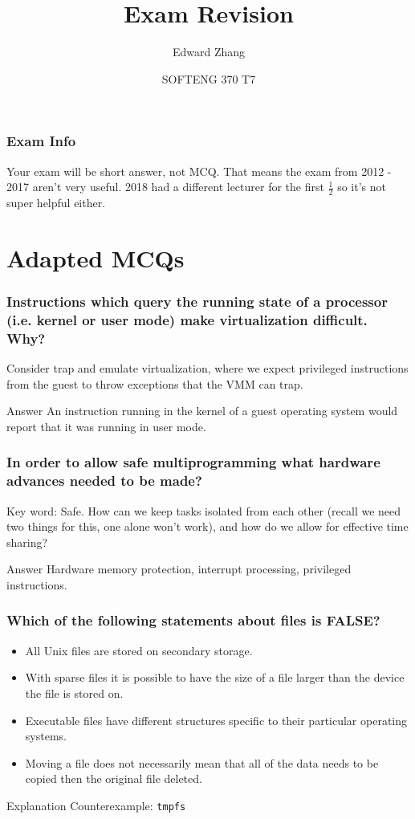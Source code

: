 \documentclass{beamer}
\title[SOFTENG 370 Tutorial 7 (2019)] %
{Exam Revision}
\author{Edward Zhang}
\date[October 2019] %
{SOFTENG 370 T7}
\begin{document}
\frame{\titlepage}
\begin{frame}
  \frametitle{Exam Info}
  Your exam will be short answer, not MCQ. That means the exam from 2012 - 2017 aren't very useful. 2018 had a different lecturer for the first $\frac{1}{2}$ so it's not super helpful either.\\
\end{frame}
\section{Adapted MCQs}
\begin{frame}
  \frametitle{Instructions which query the running state of a processor (i.e. kernel or user mode) make virtualization difficult. Why?}
  \pause
  Consider trap and emulate virtualization, where we expect privileged instructions from the guest to throw exceptions that the VMM can trap.
  \pause
  \begin{block}{Answer}
    An instruction running in the kernel of a guest operating system would report that it was running in user mode.
  \end{block}
\end{frame}
\begin{frame}
  \frametitle{In order to allow safe multiprogramming what hardware advances needed to be made?}
  \pause
  Key word: Safe. How can we keep tasks isolated from each other (recall we need two things for this, one alone won't work), and how do we allow for effective time sharing?
  \pause
  \begin{block}{Answer}
    Hardware memory protection, interrupt processing, privileged instructions.
  \end{block}
\end{frame}
\begin{frame}
  \frametitle{Which of the following statements about files is FALSE?}
  \begin{itemize}
    \item<alert@2> All Unix files are stored on secondary storage.
    \item With sparse files it is possible to have the size of a file larger than the device the file is stored on.
    \item Executable files have different structures specific to their particular operating systems.
    \item Moving a file does not necessarily mean that all of the data needs to be copied then the original file deleted.
  \end{itemize}
  \pause
  \begin{block}{Explanation}
    Counterexample: \texttt{tmpfs}
  \end{block}
\end{frame}
\end{document}

